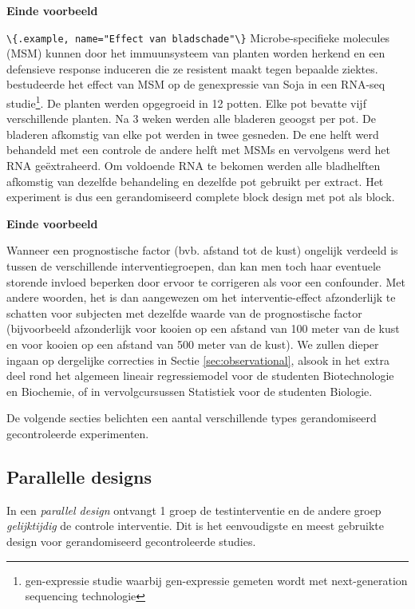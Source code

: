 \documentclass[
  12pt,dutch,coursenotes]{book}
\newcommand{\passthrough}[1]{#1}
\begin{document}
\textbf{Einde voorbeeld}

\passthrough{\lstinline!\{.example, name="Effect van bladschade"\}!}
Microbe-specifieke molecules (MSM) kunnen door het immuunsysteem van planten worden herkend en een defensieve response induceren die ze resistent maakt tegen bepaalde ziektes. \citet{Valdes2014} bestudeerde het effect van MSM op de genexpressie van Soja in een RNA-seq studie\footnote{gen-expressie studie waarbij gen-expressie gemeten wordt met next-generation sequencing technologie}. De planten werden opgegroeid in 12 potten. Elke pot bevatte vijf verschillende planten. Na 3 weken werden alle bladeren geoogst per pot. De bladeren afkomstig van elke pot werden in twee gesneden. De ene helft werd behandeld met een controle de andere helft met MSMs en vervolgens werd het RNA geëxtraheerd. Om voldoende RNA te bekomen werden alle bladhelften afkomstig van dezelfde behandeling en dezelfde pot gebruikt per extract. Het experiment is dus een gerandomiseerd complete block design met pot als block.

\textbf{Einde voorbeeld}

Wanneer een prognostische factor (bvb. afstand tot de kust) ongelijk verdeeld is
tussen de verschillende interventiegroepen, dan kan men toch haar eventuele
storende invloed beperken door ervoor te corrigeren als voor een confounder.
Met andere woorden, het is dan aangewezen om het interventie-effect
afzonderlijk te schatten voor subjecten met dezelfde waarde van de
prognostische factor (bijvoorbeeld afzonderlijk voor kooien op een afstand van 100 meter van de kust en voor kooien op een afstand van 500 meter van de kust). We zullen dieper ingaan op dergelijke correcties
in Sectie \ref{sec:observational}, alsook in het extra deel rond het algemeen lineair regressiemodel voor de studenten Biotechnologie en Biochemie, of in vervolgcursussen Statistiek voor de studenten Biologie.

De volgende secties belichten een aantal verschillende types gerandomiseerd
gecontroleerde experimenten.

\hypertarget{parallelle-designs}{%
\subsection{Parallelle designs}\label{parallelle-designs}}

In een \emph{parallel design} ontvangt 1 groep de testinterventie en de
andere groep \emph{gelijktijdig} de controle interventie. Dit is het
eenvoudigste en meest gebruikte design voor gerandomiseerd gecontroleerde
studies.
\end{document}
